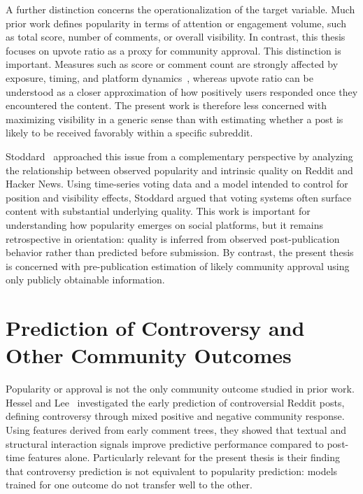 A further distinction concerns the operationalization of the target variable. Much prior work defines popularity in terms of attention or engagement volume, such as total score, number of comments, or overall visibility. In contrast, this thesis focuses on upvote ratio as a proxy for community approval. This distinction is important. Measures such as score or comment count are strongly affected by exposure, timing, and platform dynamics~\cite{chan2025examining, chan2024understanding, barnes2024topicality}, whereas upvote ratio can be understood as a closer approximation of how positively users responded once they encountered the content. The present work is therefore less concerned with maximizing visibility in a generic sense than with estimating whether a post is likely to be received favorably within a specific subreddit.

Stoddard~\cite{stoddard2015popularity} approached this issue from a complementary perspective by analyzing the relationship between observed popularity and intrinsic quality on Reddit and Hacker News. Using time-series voting data and a model intended to control for position and visibility effects, Stoddard argued that voting systems often surface content with substantial underlying quality. This work is important for understanding how popularity emerges on social platforms, but it remains retrospective in orientation: quality is inferred from observed post-publication behavior rather than predicted before submission. By contrast, the present thesis is concerned with pre-publication estimation of likely community approval using only publicly obtainable information.

\section{Prediction of Controversy and Other Community Outcomes}

Popularity or approval is not the only community outcome studied in prior work. Hessel and Lee~\cite{hessel2019something} investigated the early prediction of controversial Reddit posts, defining controversy through mixed positive and negative community response. Using features derived from early comment trees, they showed that textual and structural interaction signals improve predictive performance compared to post-time features alone. Particularly relevant for the present thesis is their finding that controversy prediction is not equivalent to popularity prediction: models trained for one outcome do not transfer well to the other.

